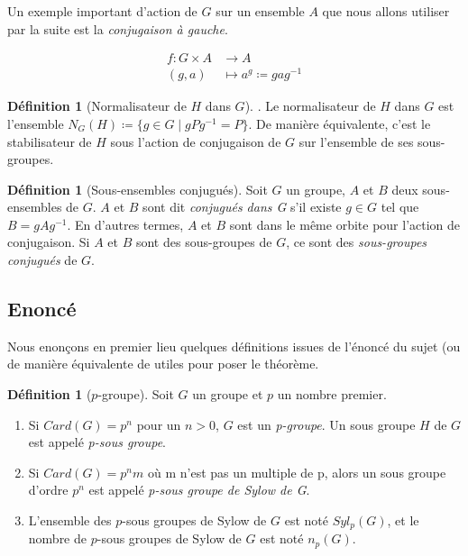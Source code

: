\documentclass{article}
\theoremstyle{definition}
\newtheorem{definition}[subsubsection]{Définition}
\theoremstyle{plain}
\theoremstyle{plain}
\theoremstyle{plain}
\theoremstyle{plain}
\theoremstyle{definition}
\theoremstyle{plain}
\theoremstyle{plain}
\begin{document}
Un exemple important d'action de \( G \) sur un ensemble \( A \) que nous allons utiliser par la suite est la \textit{conjugaison à gauche}.


\begin{align*}
	f : G \times A &\to A \\
	(g,a) &\mapsto a^{g} \coloneq gag^{-1}
\end{align*}

\begin{definition}[Normalisateur de \ensuremath{H} dans \ensuremath{G}]\cite[p.~217]{chen2024napkin}.
	Le normalisateur de \( H \) dans \( G \) est l'ensemble 
	\( N_{G}({H}) \coloneq \{ g \in G \mid gPg^{-1} = P \} \).
	De manière équivalente, c'est le stabilisateur de \( H \) sous l'action de conjugaison de \( G \) sur l'ensemble de ses sous-groupes.
\end{definition}

\begin{definition}[Sous-ensembles conjugués]\cite[p. ~123]{dummit2003abstract} 
	Soit \( G \) un groupe, \( A \) et \( B \) deux sous-ensembles de \( G \). 
	\( A \) et \( B \) sont dit 
	\textit{conjugués dans G} s'il existe \( g \in G \) tel que \( B = gAg^{-1} \).
	En d'autres termes, \( A \) et \( B \) sont dans le même orbite pour l'action de conjugaison. Si \( A \) et \( B \) sont des sous-groupes de \( G \), ce sont des \textit{sous-groupes conjugués} de \( G \).
\end{definition}


\subsection{Enoncé}

Nous enonçons en premier lieu quelques définitions issues de l'énoncé du sujet (ou de manière équivalente de \cite[p. ~123 et 139]{dummit2003abstract} utiles pour poser le théorème.

\begin{definition}[\ensuremath{p}-groupe]
	Soit \( G \) un groupe et \( p \) un nombre premier.
	\begin{enumerate}[label = (\roman*)]
	\item Si \( Card(G) = p^{n} \) pour un \( n > 0 \), \( G \) est un \textit{p-groupe}. Un sous groupe \( H \) de \( G \) est appelé \textit{p-sous groupe}.
	\item Si \( Card(G) = p^{n}m \) où m n'est pas un multiple de p, alors un sous groupe d'ordre \( p^{n} \) est appelé \textit{p-sous groupe de Sylow de G}.
	\item L'ensemble des \(p\)-sous groupes de Sylow de \( G \) est noté \( Syl_{p}(G) \), et le nombre de \(p\)-sous groupes de Sylow de \( G \) est noté \( n_{p}(G) \).
	\end{enumerate}
\end{definition}
\end{document}
